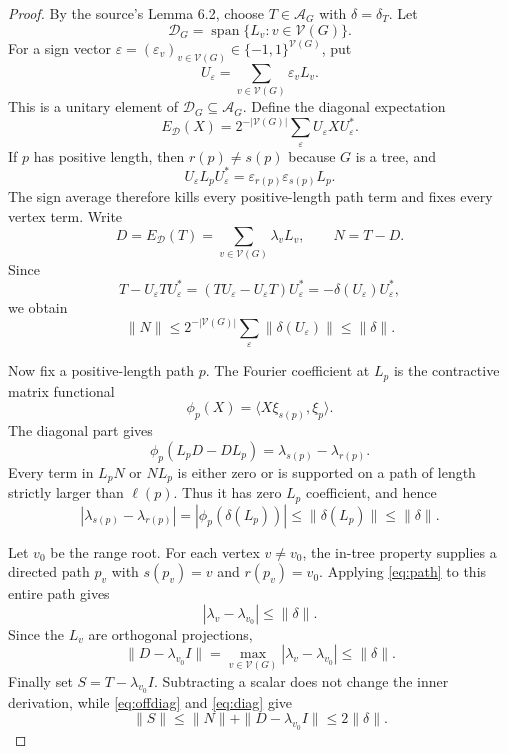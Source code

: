 \documentclass[11pt]{article}
\newcommand{\A}{\mathcal A}
\newcommand{\D}{\mathcal D}
\newcommand{\V}{\mathcal V}
\begin{document}
\begin{proof}
By the source's Lemma 6.2, choose $T\in\A_G$ with $\delta=\delta_T$.
Let
\[
 \D_G=\operatorname{span}\{L_v:v\in\V(G)\}.
\]
For a sign vector $\varepsilon=(\varepsilon_v)_{v\in\V(G)}\in
\{-1,1\}^{\V(G)}$, put
\[
 U_\varepsilon=\sum_{v\in\V(G)}\varepsilon_vL_v.
\]
This is a unitary element of $\D_G\subseteq\A_G$.  Define the diagonal
expectation
\[
 E_{\D}(X)=2^{-|\V(G)|}\sum_\varepsilon
 U_\varepsilon XU_\varepsilon^*.
\]
If $p$ has positive length, then $r(p)\neq s(p)$ because $G$ is a tree, and
\[
 U_\varepsilon L_pU_\varepsilon^*
 =\varepsilon_{r(p)}\varepsilon_{s(p)}L_p.
\]
The sign average therefore kills every positive-length path term and fixes
every vertex term.  Write
\[
 D=E_{\D}(T)=\sum_{v\in\V(G)}\lambda_vL_v,
 \qquad N=T-D.
\]
Since
\[
 T-U_\varepsilon TU_\varepsilon^*
 =(TU_\varepsilon-U_\varepsilon T)U_\varepsilon^*
 =-\delta(U_\varepsilon)U_\varepsilon^*,
\]
we obtain
\begin{equation}\label{eq:offdiag}
 \|N\|
 \leq 2^{-|\V(G)|}\sum_\varepsilon
       \|\delta(U_\varepsilon)\|
 \leq \|\delta\|.
\end{equation}

Now fix a positive-length path $p$.  The Fourier coefficient at $L_p$ is the
contractive matrix functional
\[
 \phi_p(X)=\langle X\xi_{s(p)},\xi_p\rangle.
\]
The diagonal part gives
\[
 \phi_p(L_pD-DL_p)=\lambda_{s(p)}-\lambda_{r(p)}.
\]
Every term in $L_pN$ or $NL_p$ is either zero or is supported on a path of
length strictly larger than $\ell(p)$.  Thus it has zero $L_p$ coefficient,
and hence
\begin{equation}\label{eq:path}
 |\lambda_{s(p)}-\lambda_{r(p)}|
 =|\phi_p(\delta(L_p))|
 \leq \|\delta(L_p)\|
 \leq \|\delta\|.
\end{equation}

Let $v_0$ be the range root.  For each vertex $v\neq v_0$, the in-tree
property supplies a directed path $p_v$ with $s(p_v)=v$ and
$r(p_v)=v_0$.  Applying \eqref{eq:path} to this entire path gives
\[
 |\lambda_v-\lambda_{v_0}|\leq\|\delta\|.
\]
Since the $L_v$ are orthogonal projections,
\begin{equation}\label{eq:diag}
 \|D-\lambda_{v_0}I\|
 =\max_{v\in\V(G)}|\lambda_v-\lambda_{v_0}|
 \leq\|\delta\|.
\end{equation}
Finally set $S=T-\lambda_{v_0}I$.  Subtracting a scalar does not change the
inner derivation, while \eqref{eq:offdiag} and \eqref{eq:diag} give
\[
 \|S\|\leq\|N\|+\|D-\lambda_{v_0}I\|
 \leq 2\|\delta\|.
\]
\end{proof}
\end{document}
